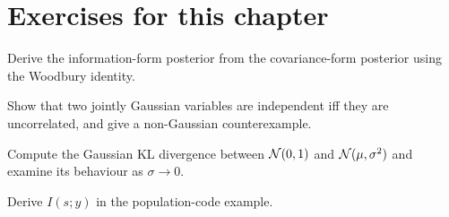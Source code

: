 \section*{Exercises for this chapter}
\begin{exercise}
Derive the information-form posterior from the covariance-form
posterior using the Woodbury identity.
\end{exercise}
\begin{exercise}
Show that two jointly Gaussian variables are independent iff they are
uncorrelated, and give a non-Gaussian counterexample.
\end{exercise}
\begin{exercise}
Compute the Gaussian KL divergence between $\mathcal{N}(0,1)$ and
$\mathcal{N}(\mu,\sigma^2)$ and examine its behaviour as $\sigma\to0$.
\end{exercise}
\begin{exercise}
Derive $I(s;y)$ in the population-code example.
\end{exercise}
